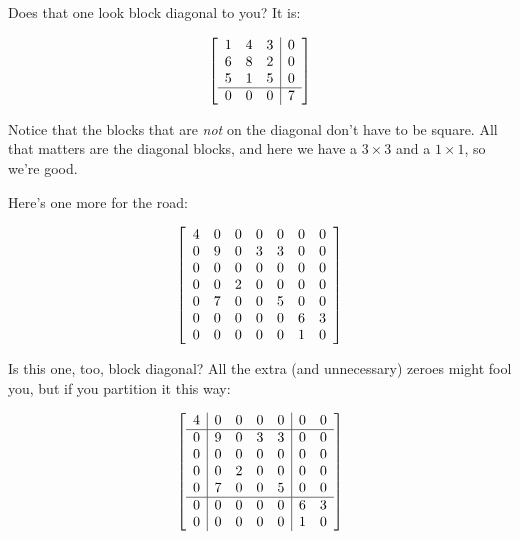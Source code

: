 Does that one look block diagonal to you? It is:

\vspace{-.15in}
\begin{align*}
\mleft[
\begin{array}{ccc|c}
1 & 4 & 3 & 0\\
6 & 8 & 2 & 0\\
5 & 1 & 5 & 0 \\
\hline
0 & 0 & 0 & 7 \\
\end{array}
\mright]
\end{align*}
\vspace{-.15in}

Notice that the blocks that are \textit{not} on the diagonal don't have to be
square. All that matters are the diagonal blocks, and here we have a $3\times
3$ and a $1\times 1$, so we're good.

Here's one more for the road:

\vspace{-.15in}
\begin{align*}
\mleft[
\begin{array}{ccccccc}
4 & 0 & 0 & 0 & 0 & 0 & 0\\
0 & 9 & 0 & 3 & 3 & 0 & 0\\
0 & 0 & 0 & 0 & 0 & 0 & 0\\
0 & 0 & 2 & 0 & 0 & 0 & 0\\
0 & 7 & 0 & 0 & 5 & 0 & 0\\
0 & 0 & 0 & 0 & 0 & 6 & 3\\
0 & 0 & 0 & 0 & 0 & 1 & 0\\
\end{array}
\mright]
\end{align*}
\vspace{-.15in}

Is this one, too, block diagonal? All the extra (and unnecessary) zeroes might
fool you, but if you partition it this way:

\vspace{-.15in}
\begin{align*}
\mleft[
\begin{array}{c|cccc|cc}
4 & 0 & 0 & 0 & 0 & 0 & 0\\
\hline
0 & 9 & 0 & 3 & 3 & 0 & 0\\
0 & 0 & 0 & 0 & 0 & 0 & 0\\
0 & 0 & 2 & 0 & 0 & 0 & 0\\
0 & 7 & 0 & 0 & 5 & 0 & 0\\
\hline
0 & 0 & 0 & 0 & 0 & 6 & 3\\
0 & 0 & 0 & 0 & 0 & 1 & 0\\
\end{array}
\mright]
\end{align*}
\vspace{-.15in}

